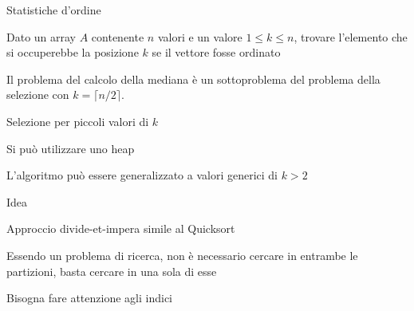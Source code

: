 \begin{frame}{Statistiche d'ordine}

\vspace{-9pt}
\begin{myboxtitle}[Selezione]
Dato un array $A$ contenente $n$ valori e un valore $1 \leq k \leq n$, 
trovare l'elemento che si occuperebbe la posizione $k$ se il vettore fosse ordinato
\end{myboxtitle}

\begin{myboxtitle}[Mediana]
Il problema del calcolo della mediana è un sottoproblema del problema
della selezione con $k=\lceil n/2 \rceil$.
\end{myboxtitle}

\end{frame}

\begin{frame}{Selezione per piccoli valori di $k$}

\vspace{-9pt}
\begin{myboxtitle}[Intuizione]
\BIL
\item Si può utilizzare uno heap
\item L'algoritmo può essere generalizzato a valori generici di $k > 2$
\EIL
\end{myboxtitle}

\end{frame}
	
\begin{frame}{Idea}

\vspace{-9pt}
\BIL
\item Approccio divide-et-impera simile al Quicksort
\item Essendo un problema di ricerca, non è necessario cercare in entrambe le partizioni, basta cercare in una sola di esse
\item Bisogna fare attenzione agli indici
\EIL

\end{frame}

